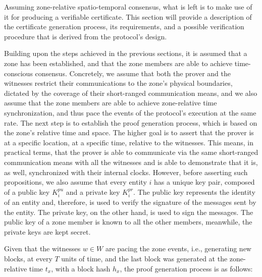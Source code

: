 Assuming zone-relative spatio-temporal consensus, what is left is to make use of it for producing a verifiable \pol{} certificate. This section will provide a description of the certificate generation process, its requirements, and a possible verification procedure that is derived from the \pol{} protocol's design. 

Building upon the steps achieved in the previous sections, it is assumed that a zone has been established, and that the zone members are able to achieve time-conscious consensus. Concretely, we assume that both the prover and the witnesses restrict their communications to the zone's physical boundaries, dictated by the coverage of their short-ranged communication means, and we also assume that the zone members are able to achieve zone-relative time synchronization, and thus pace the events of the protocol's execution at the same rate. The next step is to establish the proof generation process, which is based on the zone's relative time and space. The higher goal is to assert that the prover is at a specific location, at a specific time, relative to the witnesses. This means, in practical terms, that the prover is able to communicate via the same short-ranged communication means with all the witnesses and is able to demonstrate that it is, as well, synchronized with their internal clocks. However, before asserting such propositions, we also assume that every entity $i$ has a unique key pair, composed of a public key $K^{pu}_i$ and a private key $K^{pr}_i$. The public key represents the identity of an entity and, therefore, is used to verify the signature of the messages sent by the entity. The private key, on the other hand, is used to sign the messages. The public key of a zone member is known to all the other members, meanwhile, the private keys are kept secret. 

Given that the witnesses $w \in W$ are pacing the zone events, i.e., generating new blocks, at every $T$ units of time, and the last block was generated at the zone-relative time $t_x$, with a block hash $h_x$, the proof generation process is as follows:

